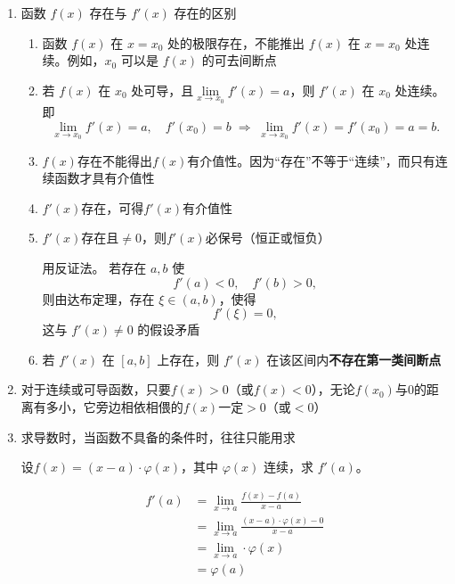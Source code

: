 \documentclass[../book.tex]{subfiles}
\begin{document}
    \begin{enumerate}
        \item 函数 $f(x)$ 存在与 $f'(x)$ 存在的区别
        \begin{enumerate}
            \item 函数 $f(x)$ 在 $x=x_0$ 处的极限存在，不能推出 $f(x)$ 在 $x=x_0$ 处连续。例如，$x_0$ 可以是 $f(x)$ 的可去间断点
            \item 若 $f(x)$ 在 $x_0$ 处可导，且$\lim\limits_{x\to x_0} f'(x)=a$，则 $f'(x)$ 在 $x_0$ 处连续。即
            \[
                \lim_{x\to x_0} f'(x)=a,\quad f'(x_0)=b
                \;\Longrightarrow\;
                \lim_{x\to x_0} f'(x)=f'(x_0)=a=b.
            \]
            \item $f(x)$存在不能得出$f(x)$有介值性。因为“存在”不等于“连续”，而只有连续函数才具有介值性
            \item $f'(x)$存在，可得$f'(x)$有介值性
            \item $f'(x)$存在且$\neq 0$，则$f'(x)$必保号（恒正或恒负）
            \begin{analysisbox}[证]
                用反证法。
                若存在 $a,b$ 使
                \[
                    f'(a)<0,\quad f'(b)>0,
                \]
                则由达布定理，存在 $\xi\in(a,b)$，使得
                \[
                    f'(\xi)=0,
                \]
                这与 $f'(x)\neq0$ 的假设矛盾
            \end{analysisbox}
            \item 若 $f'(x)$ 在 $[a,b]$ 上存在，则 $f'(x)$ 在该区间内\textbf{不存在第一类间断点}
        \end{enumerate}
        \item 对于连续或可导函数，只要$f(x) > 0$（或$f(x) < 0$），无论$f(x_0)$与$0$的距离有多小，它旁边相依相偎的$f(x)$一定$> 0$（或$< 0$）

        \item 求导数时，当函数不具备{\color{red}{导数存在}}的条件时，往往只能用{\color{red}{导数定义}}求
        \begin{analysisbox}[Example]
            设$f(x) = (x-a)\cdot\varphi(x)$，其中 $\varphi(x)$ 连续，求 $f'(a)$。

            \[
                \begin{aligned}
                    f'(a)
                    &= \lim_{x\to a}\frac{f(x)-f(a)}{x-a} \\
                    &= \lim_{x\to a}\frac{(x-a)\cdot\varphi(x)-0}{x-a} \\
                    &= \lim_{x\to a}\cdot\varphi(x) \\
                    &= \varphi(a)
                \end{aligned}
            \]
        \end{analysisbox}


\end{enumerate}
\end{document}
